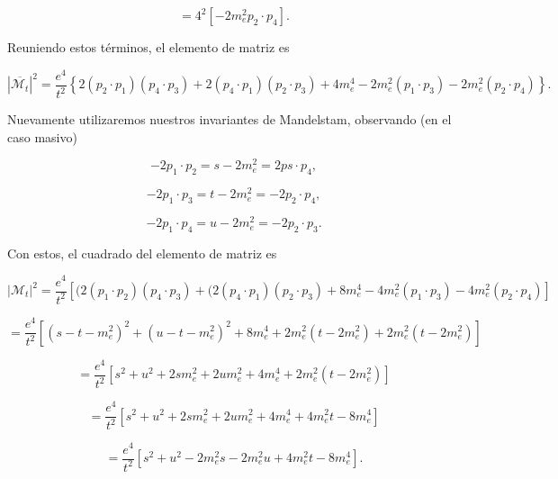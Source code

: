 \begin{equation}
= 4^2 \left[ -2m_e^2 p_2 \cdot p_4 \right].
\end{equation}

Reuniendo estos términos, el elemento de matriz es

\begin{equation}
|\overline{\mathcal{M}_t}|^2 = \frac{e^4}{t^2} \left\{ 2(p_2 \cdot p_1)(p_4 \cdot p_3) + 2(p_4 \cdot p_1)(p_2 \cdot p_3) + 4m_e^4 - 2m_e^2(p_1 \cdot p_3) - 2m_e^2(p_2 \cdot p_4) \right\}.
\end{equation}

Nuevamente utilizaremos nuestros invariantes de Mandelstam, observando (en el caso masivo)

\begin{equation}
-2p_1 \cdot p_2 = s - 2m_e^2 = 2ps \cdot p_4,
\end{equation}

\begin{equation}
-2p_1 \cdot p_3 = t - 2m_e^2 = -2p_2 \cdot p_4,
\end{equation}

\begin{equation}
-2p_1 \cdot p_4 = u - 2m_e^2 = -2p_2 \cdot p_3.
\end{equation}

Con estos, el cuadrado del elemento de matriz es

\begin{equation}
|\mathcal{M}_t|^2 = \frac{e^4}{t^2} \left[ (2(p_1 \cdot p_2)(p_4 \cdot p_3) + (2(p_4 \cdot p_1)(p_2 \cdot p_3) + 8m_e^4 - 4m_e^2(p_1 \cdot p_3) - 4m_e^2(p_2 \cdot p_4) \right]
\end{equation}

\begin{equation}
= \frac{e^4}{t^2} \left[ (s - t - m_e^2)^2 + (u - t - m_e^2)^2 + 8m_e^4 + 2m_e^2(t - 2m_e^2) + 2m_e^2(t - 2m_e^2) \right]
\end{equation}

\begin{equation}
= \frac{e^4}{t^2} \left[ s^2 + u^2 + 2sm_e^2 + 2um_e^2 + 4m_e^4 + 2m_e^2(t - 2m_e^2) \right]
\end{equation}

\begin{equation}
= \frac{e^4}{t^2} \left[ s^2 + u^2 + 2sm_e^2 + 2um_e^2 + 4m_e^4 + 4m_e^2t - 8m_e^4 \right]
\end{equation}

\begin{equation}
= \frac{e^4}{t^2} \left[ s^2 + u^2 - 2m_e^2s - 2m_e^2u + 4m_e^2t - 8m_e^4 \right].
\end{equation}


